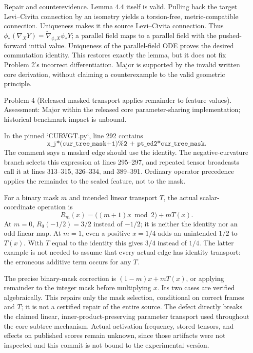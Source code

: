 \documentclass[10pt]{article}
\begin{document}
Repair and counterevidence. Lemma 4.4 itself is valid. Pulling back the target Levi–Civita connection by an isometry yields a torsion-free, metric-compatible connection. Uniqueness makes it the source Levi–Civita connection. Thus \(\phi_*(\nabla_XY)=\widetilde\nabla_{\phi_*X}\phi_*Y\); a parallel field maps to a parallel field with the pushed-forward initial value. Uniqueness of the parallel-field ODE proves the desired commutation identity. This restores exactly the lemma, but it does not fix Problem 2’s incorrect differentiation. Major is supported by the invalid written core derivation, without claiming a counterexample to the valid geometric principle.\par
Problem 4 (Released masked transport applies remainder to feature values).  Assessment: Major within the released core parameter-sharing implementation; historical benchmark impact is unbound.\par
In the pinned `CURVGT.py`, line 292 contains \[\texttt{x\_j*(cur\_tree\_mask+1)\%2 + pt\_ed2*cur\_tree\_mask}.\] The comment says a masked edge should use the identity. The negative-curvature branch selects this expression at lines 295–297, and repeated tensor broadcasts call it at lines 313–315, 326–334, and 389–391. Ordinary operator precedence applies the remainder to the scaled feature, not to the mask.\par
For a binary mask \(m\) and intended linear transport \(T\), the actual scalar-coordinate operation is \[R_m(x)=\bigl((m+1)x\bmod 2\bigr)+mT(x).\] At \(m=0\), \(R_0(-1/2)=3/2\) instead of \(-1/2\); it is neither the identity nor an odd linear map. At \(m=1\), even a positive \(x=1/4\) adds an unintended \(1/2\) to \(T(x)\). With \(T\) equal to the identity this gives \(3/4\) instead of \(1/4\). The latter example is not needed to assume that every actual edge has identity transport: the erroneous additive term occurs for any \(T\).\par
The precise binary-mask correction is \((1-m)x+mT(x)\), or applying remainder to the integer mask before multiplying \(x\). Its two cases are verified algebraically. This repairs only the mask selection, conditional on correct frames and \(T\); it is not a certified repair of the entire source. The defect directly breaks the claimed linear, inner-product-preserving parameter transport used throughout the core subtree mechanism. Actual activation frequency, stored tensors, and effects on published scores remain unknown, since those artifacts were not inspected and this commit is not bound to the experimental version.\par
\end{document}
